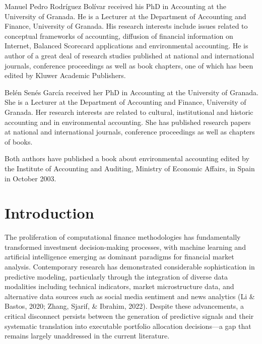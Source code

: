 \documentclass{singlecol-new}
\theoremstyle{TH}{
\newtheorem{lemma}{Lemma}
\newtheorem{theorem}[lemma]{Theorem}
\newtheorem{corrolary}[lemma]{Corrolary}
\newtheorem{conjecture}[lemma]{Conjecture}
\newtheorem{proposition}[lemma]{Proposition}
\newtheorem{claim}[lemma]{Claim}
\newtheorem{stheorem}[lemma]{Wrong Theorem}
\newtheorem{algorithm}{Algorithm}
}
\theoremstyle{THrm}{
\newtheorem{definition}{Definition}[section]
\newtheorem{question}{Question}[section]
\newtheorem{remark}{Remark}
\newtheorem{scheme}{Scheme}
}
\theoremstyle{THhit}{
\newtheorem{case}{Case}[section]
}
\begin{document}
\begin{bio}
Manuel Pedro Rodr\'iguez Bol\'ivar received his PhD in Accounting at
the University of Granada. He is a Lecturer at the Department of
Accounting and Finance, University of Granada. His research
interests include issues related to conceptual frameworks of
accounting, diffusion of financial information on Internet, Balanced
Scorecard applications and environmental accounting. He is author of
a great deal of research studies published at national and
international journals, conference proceedings as well as book
chapters, one of which has been edited by Kluwer Academic
Publishers.

\noindent Bel\'en Sen\'es Garc\'ia received her PhD in Accounting at
the University of Granada. She is a Lecturer at the Department of
Accounting and Finance, University of Granada. Her research
interests are related to cultural, institutional and historic
accounting and in environmental accounting. She has published
research papers at national and international journals, conference
proceedings as well as chapters of books.

\noindent Both authors have published a book about environmental
accounting edited by the Institute of Accounting and Auditing,
Ministry of Economic Affairs, in Spain in October 2003.
\end{bio}


\maketitle


 \section{Introduction}

The proliferation of computational finance methodologies has fundamentally transformed investment decision-making processes, with machine learning and artificial intelligence emerging as dominant paradigms for financial market analysis. Contemporary research has demonstrated considerable sophistication in predictive modeling, particularly through the integration of diverse data modalities including technical indicators, market microstructure data, and alternative data sources such as social media sentiment and news analytics (Li \& Bastos, 2020; Zhang, Sjarif, \& Ibrahim, 2022). Despite these advancements, a critical disconnect persists between the generation of predictive signals and their systematic translation into executable portfolio allocation decisions—a gap that remains largely unaddressed in the current literature.
\end{document}
